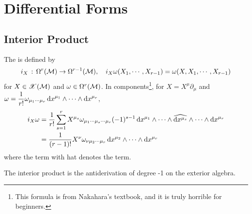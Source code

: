 \documentclass[a4paper, 10pt]{article}
\begin{document}
\setcounter{section}{6}
\section{Differential Forms}

\setcounter{subsection}{2}
\subsection{Interior Product}

\setcounter{theorem}{21}

\begin{definition}
    The  is defined by
    \[ i_{X} \,:\, \Omega^{r}(\mathcal{M}) \rightarrow \Omega^{r-1}(\mathcal{M}), \quad i_{X}\omega(X_{1}, \cdots, X_{r-1}) = \omega(X, X_{1}, \cdots, X_{r-1}) \]
    for $X \in \mathscr{X}(\mathcal{M})$ and $\omega \in \Omega^{r}(\mathcal{M})$. In components\footnote{This formula is from Nakahara's textbook, and it is truly horrible for beginners.}, for $X = X^{\mu}\partial_{\mu}$ and $\displaystyle{\omega = \frac{1}{r!}\omega_{\mu_{1}\cdots\mu_{r}}\,\mathrm{d}{x}^{\mu_{1}}\wedge\cdots\wedge\mathrm{d}{x}^{\mu_{r}}}$,
    \begin{align*}
        i_{X}\omega &= \frac{1}{r!}\sum_{s=1}^{r}X^{\mu_{s}}\omega_{\mu_{1}\cdots\mu_{s}\cdots\mu_{r}} (-1)^{s-1}\,\mathrm{d}{x}^{\mu_{1}}\wedge\cdots\wedge\widehat{\mathrm{d}{x}^{\mu_{s}}}\wedge\cdots\wedge\mathrm{d}{x}^{\mu_{r}} \\
        &= \frac{1}{(r-1)!} X^{\nu}\omega_{\nu\mu_{2}\cdots\mu_{r}} \,\mathrm{d}{x}^{\mu_{2}}\wedge\cdots\wedge\mathrm{d}{x}^{\mu_{r}}
    \end{align*}
    where the term with hat denotes the  term.
\end{definition}

\begin{remark}
    The interior product is the  antiderivation of degree -1 on the exterior algebra.
\end{remark}

\seprule
\end{document}
